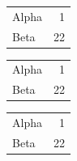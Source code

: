 \documentclass[aspectratio=169]{beamer}
\begin{document}
\begin{frame}[plain,t]
\setlength{\tabcolsep}{1em}\small\begin{tabular}{lr}\toprule Alpha&1\\Beta&22\\\bottomrule\end{tabular}
\end{frame}
\begin{frame}[plain,t]
\small\setlength{\tabcolsep}{1em}\normalsize\begin{tabular}{lr}\toprule Alpha&1\\Beta&22\\\bottomrule\end{tabular}
\end{frame}
\begin{frame}[plain,t]
\setlength{\belowrulesep}{1ex}\small\begin{tabular}{lr}\toprule Alpha&1\\Beta&22\\\bottomrule\end{tabular}
\end{frame}
\end{document}
